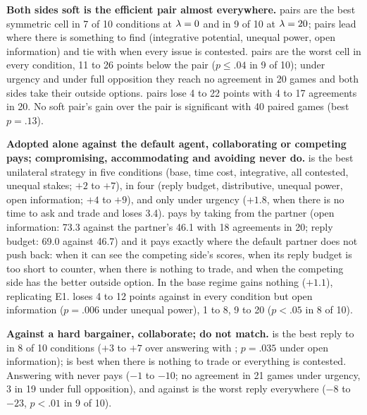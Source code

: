 \textbf{Both sides soft is the efficient pair almost everywhere.} \accommodating{} pairs are the best symmetric cell in 7 of 10 conditions at $\lambda = 0$ and in 9 of 10 at $\lambda = 20$; \collaborating{} pairs lead where there is something to find (integrative potential, unequal power, open information) and tie with \neutral{} when every issue is contested. \competing{} pairs are the worst cell in every condition, 11 to 26 points below the \neutral{} pair ($p \le .04$ in 9 of 10); under urgency and under full opposition they reach no agreement in 20 games and both sides take their outside options. \avoiding{} pairs lose 4 to 22 points with 4 to 17 agreements in 20. No soft pair's gain over the \neutral{} pair is significant with 40 paired games (best $p = .13$).

\textbf{Adopted alone against the default agent, collaborating or competing pays; compromising, accommodating and avoiding never do.} \collaborating{} is the best unilateral strategy in five conditions (base, time cost, integrative, all contested, unequal stakes; $+2$ to $+7$), \competing{} in four (reply budget, distributive, unequal power, open information; $+4$ to $+9$), and \accommodating{} only under urgency ($+1.8$, when there is no time to ask and trade and \collaborating{} loses 3.4). \competing{} pays by taking from the partner (open information: 73.3 against the partner's 46.1 with 18 agreements in 20; reply budget: 69.0 against 46.7) and it pays exactly where the default partner does not push back: when it can see the competing side's scores, when its reply budget is too short to counter, when there is nothing to trade, and when the competing side has the better outside option. In the base regime \competing{} gains nothing ($+1.1$), replicating E1. \compromising{} loses 4 to 12 points against \neutral{} in every condition but open information ($p = .006$ under unequal power), \accommodating{} 1 to 8, \avoiding{} 9 to 20 ($p < .05$ in 8 of 10).

\textbf{Against a hard bargainer, collaborate; do not match.} \collaborating{} is the best reply to \competing{} in 8 of 10 conditions ($+3$ to $+7$ over answering with \neutral; $p = .035$ under open information); \neutral{} is best when there is nothing to trade or everything is contested. Answering \competing{} with \competing{} never pays ($-1$ to $-10$; no agreement in 21 games under urgency, 3 in 19 under full opposition), and \avoiding{} against \competing{} is the worst reply everywhere ($-8$ to $-23$, $p < .01$ in 9 of 10).

